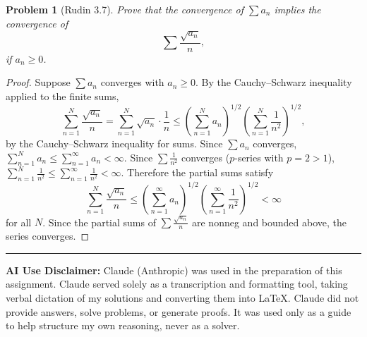 \documentclass[12 pt]{article}        	%
\newtheorem{prob}{Problem}
\begin{document}
\begin{prob}[Rudin 3.7]
Prove that the convergence of $\sum a_n$ implies the convergence of
\[
\sum \frac{\sqrt{a_n}}{n},
\]
if $a_n \geq 0$.
\end{prob}
\begin{proof}
Suppose $\sum a_n$ converges with $a_n \geq 0$. By the Cauchy--Schwarz inequality applied to the finite sums,
\[
\sum_{n=1}^{N} \frac{\sqrt{a_n}}{n} = \sum_{n=1}^{N} \sqrt{a_n} \cdot \frac{1}{n} \leq \left(\sum_{n=1}^{N} a_n\right)^{1/2} \left(\sum_{n=1}^{N} \frac{1}{n^2}\right)^{1/2},
\]
by the Cauchy--Schwarz inequality for sums. Since $\sum a_n$ converges, $\sum_{n=1}^{N} a_n \leq \sum_{n=1}^{\infty} a_n < \infty$. Since $\sum \frac{1}{n^2}$ converges ($p$-series with $p = 2 > 1$), $\sum_{n=1}^{N} \frac{1}{n^2} \leq \sum_{n=1}^{\infty} \frac{1}{n^2} < \infty$. Therefore the partial sums satisfy
\[
\sum_{n=1}^{N} \frac{\sqrt{a_n}}{n} \leq \left(\sum_{n=1}^{\infty} a_n\right)^{1/2} \left(\sum_{n=1}^{\infty} \frac{1}{n^2}\right)^{1/2} < \infty
\]
for all $N$. Since the partial sums of $\sum \frac{\sqrt{a_n}}{n}$ are nonneg and bounded above, the series converges.
\end{proof}

\vspace{2em}
\hrule
\vspace{1em}
\noindent\textbf{AI Use Disclaimer:} Claude (Anthropic) was used in the preparation of this assignment. Claude served solely as a transcription and formatting tool, taking verbal dictation of my solutions and converting them into \LaTeX. Claude did not provide answers, solve problems, or generate proofs. It was used only as a guide to help structure my own reasoning, never as a solver.
\end{document}
